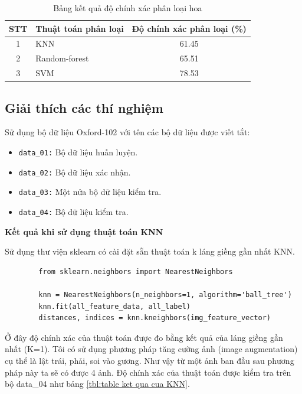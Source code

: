 \documentclass[12pt]{report}
\begin{document}
		\begin{table}[h]
			\centering
			\caption{Bảng kết quả độ chính xác phân loại hoa}
			\label{tbl:table ket qua phan loai hoa}
			\begin{tabular}{|c|l|c|}
				\hline
				\textbf{STT} & \textbf{Thuật toán phân loại} & \textbf{Độ chính xác phân loại (\%)} \\ \hline
				1            & KNN                                 & 61.45                                        \\ \hline
				2            & Random-forest                       & 65.51                                        \\ \hline
				3            & SVM                                 & 78.53                                        \\ \hline
			\end{tabular}
		\end{table}
				
		\subsection{Giải thích các thí nghiệm}
		Sử dụng bộ dữ liệu Oxford-102 với tên các bộ dữ liệu được viết tắt:
		\begin{itemize}
			\item \texttt{data\_01:} Bộ dữ liệu huấn luyện.
			\item \texttt{data\_02:} Bộ dữ liệu xác nhận.
			\item \texttt{data\_03:} Một nửa bộ dữ liệu kiểm tra.
			\item \texttt{data\_04:} Bộ dữ liệu kiểm tra.
		\end{itemize}
				
		\textbf{Kết quả khi sử dụng thuật toán KNN}
						
		Sử dụng thư viện sklearn có cài đặt sẵn thuật toán k láng giềng gần nhất KNN.
		\begin{lstlisting}
		from sklearn.neighbors import NearestNeighbors

		knn = NearestNeighbors(n_neighbors=1, algorithm='ball_tree')
		knn.fit(all_feature_data, all_label)
		distances, indices = knn.kneighbors(img_feature_vector)
		\end{lstlisting}
				
		Ở đây độ chính xác của thuật toán được đo bằng kết quả của láng giềng gần nhất (K=1). Tôi có sử dụng phương pháp tăng cường ảnh (image augmentation) cụ thể là lật trái, phải, soi vào gương. Như vậy từ một ảnh ban đầu sau phương pháp này ta sẽ có được 4 ảnh. Độ chính xác của thuật toán được kiểm tra trên bộ data\_04 như bảng \ref{tbl:table ket qua cua KNN}.
				
\end{document}
